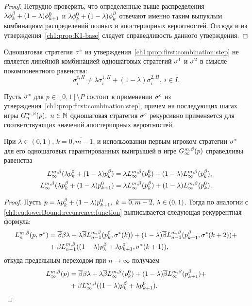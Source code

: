 {\begin{proof}
  Нетрудно проверить, что определенные выше распределения $\lambda \fOdd + (1-\lambda) \fEven[k+1]$ и $\lambda \fEven + (1-\lambda) \fOdd$ отвечают именно таким выпуклым комбинациям распределений полных и апостериорных вероятностей.
  Отсюда и из утверждения~\ref{ch1:prop:K1-base} следует справедливость данного утверждения.
\end{proof}

\begin{remark}
  Одношаговая стратегия $\sigmar^c$ из утверждения~\ref{ch1:prop:first:combination:step} не является линейной комбинацией одношаговых стратегий $\sigmar^1$ и $\sigmar^2$ в смысле покомпонентного равенства:
  \[
    \sigma^{c,H}_i \neq \lambda \sigma^{1,H}_i + (1-\lambda) \sigma^{2,H}_i,\ i \in I.
  \]
\end{remark}

Пусть $\sigmar^*$ для $p \in [0,1] \setminus P$ состоит в применении $\sigmar^c$ из утверждения~\ref{ch1:prop:first:combination:step}, причем на последующих шагах игры $\theG*{n}(p),\ n \in \N$ одношаговая стратегия $\sigmar^c$ рекурсивно применяется для соответствующих значений апостериорных вероятностей.

\begin{proposition}
  \label{ch1:prop:first:combination:game}
  При $\lambda \in (0, 1), \, k = \overline{0, m-1}$, и использовании первым игроком стратегии $\sigmar^*$ для его одношаговых гарантированных выигрышей в игре $\theG*{\infty}(p)$ справедливы равенства
  \begin{align*}
    \L*{\infty}(\lambda \pEven + (1-\lambda) \pOdd)      
    &= 
      \lambda \L*{\infty}(\pEven) + (1-\lambda) \L*{\infty}(\pOdd), \\
    \L*\infty(\lambda \pOdd + (1-\lambda) \pEven[k+1]) 
    &= \lambda \L*{\infty}( \pOdd ) + (1-\lambda) \L*{\infty}(\pEven).
  \end{align*}
\end{proposition}
\begin{proof}
  Пусть $p = \lambda \pOdd + (1-\lambda) \pEven[k+1],\ k = \overline{0, m - 2}, \, \lambda \in (0, 1)$.
  Тогда по аналогии с \eqref{ch1:eq:lowerBound:recurrence:function} выписывается следующая рекуррентная формула:
  \begin{align*}
    \L*{n}(p, \sigmar^*)
    &= \DCo \Co \lambda +
      \lambda \DCo \L*{n-1}(\pEven, \sigmaran{*}{k}) +
      (1-\lambda) \DCo \L*{n-1}(\pOdd[k+1], \sigmaran{*}{k+2}) + \\
    &+ \Co \L*{n-1}((1-\lambda) \pOdd + \lambda \pEven[k+1], \sigmaran{*}{k+1}),
  \end{align*}
  откуда предельным переходом при $n \rightarrow \infty$ получаем
  \begin{equation}
    \label{ch1:eq:prop:L(comb)}
    \begin{aligned}
    \L*{\infty}(p) 
    &= \DCo \Co \lambda +
    \lambda \DCo \L*{\infty}(\pEven) +
    (1-\lambda) \DCo \L*{\infty}(\pOdd[k+1]) + \\
    &+ \Co \L*{\infty}( (1-\lambda) \pOdd + \lambda \pEven[k+1] ).
    \end{aligned}
  \end{equation}
  

\end{proof}}
